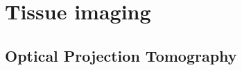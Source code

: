 \documentclass[12pt]{article}
\begin{document}
 

 






 









\newpage
\section{Tissue imaging}
\subsection{Optical Projection Tomography}
\end{document}
